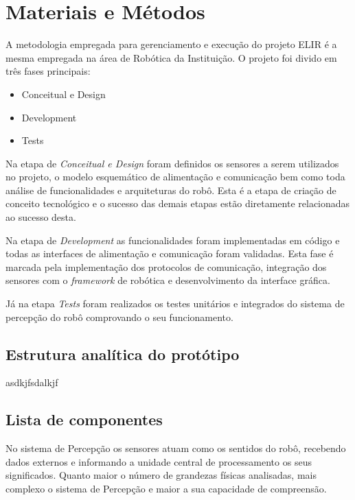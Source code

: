 
\chapter{Materiais e Métodos}
\label{chap:mat}

A metodologia empregada para gerenciamento e execução do projeto ELIR é a mesma empregada na área de Robótica da Instituição. O projeto foi divido em três fases principais:

\begin{itemize}
	\item Conceitual e Design
	\item Development
	\item Tests
\end{itemize}

Na etapa de \textit{Conceitual e Design} foram definidos os sensores a serem utilizados no projeto, o modelo esquemático de alimentação e comunicação bem como toda análise de funcionalidades e arquiteturas do robô. Esta é a etapa de criação de conceito tecnológico e o sucesso das demais etapas estão diretamente relacionadas ao sucesso desta.

Na etapa de \textit{Development} as funcionalidades foram implementadas em código e todas as interfaces de alimentação e comunicação foram validadas. Esta fase é marcada pela implementação dos protocolos de comunicação, integração dos sensores com o \textit{framework} de robótica e desenvolvimento da interface gráfica.

Já na etapa \textit{Tests} foram realizados os testes unitários e integrados do sistema de percepção do robô comprovando o seu funcionamento.


\section{Estrutura analítica do protótipo}
\label{ssec:pbs}
asdkjfsdalkjf

\section{Lista de componentes}
\label{ssec:list}

No sistema de Percepção os sensores atuam como os sentidos do robô, recebendo dados externos e informando a unidade central de processamento os seus significados. Quanto maior o número de grandezas físicas analisadas, mais complexo o sistema de Percepção e maior a sua capacidade de compreensão. 

